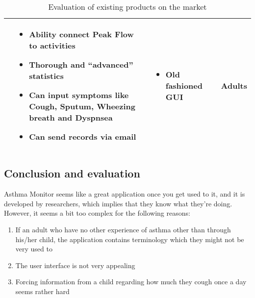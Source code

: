 \begin{sidewaystable}
\begin{tabular}{ | p{4.0cm} | p{5.5cm} | p{5.5cm} | p{4cm}|}
	&
	\begin{itemize}
	  \item Ability connect Peak Flow to activities
	  \item Thorough and ``advanced'' statistics
	  \item Can input symptoms like Cough, Sputum, Wheezing breath and Dyspnsea 
	  \item Can send records via email
	\end{itemize}
	&
	\begin{itemize}
	  \item Old fashioned GUI
	\end{itemize}
	& 
	Adults
	\\ \hline
	\end{tabular}
	\caption{Evaluation of existing products on the market}
\end{sidewaystable}

\subsection{Conclusion and evaluation}
\label{sec:existingconcl}


Asthma Monitor seems like a great application once you get used to it, and it is developed by researchers, which implies that they know what they're doing. However, it seems a bit too complex for the following reasons:
\begin{enumerate}
  \item If an adult who have no other experience of asthma other than through his/her child, the application contains terminology which they might not be very used to
  \item The user interface is not very appealing
  \item Forcing information from a child regarding how much they cough once a day seems rather hard 
\end{enumerate}   

